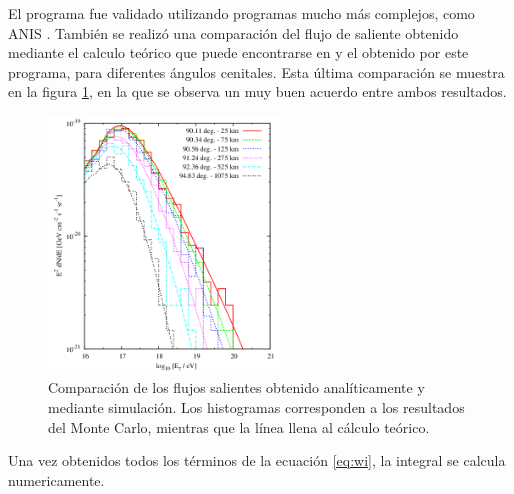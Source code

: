 		El programa fue validado utilizando programas mucho m\'as complejos, como ANIS \cite{anis}.
		Tambi\'en se realiz\'o una comparaci\'on del flujo de \tauon{} saliente obtenido mediante el calculo te\'orico que puede encontrarse en \cite{prop_tau} y el obtenido por este programa, para diferentes \'angulos cenitales.
		Esta \'ultima comparaci\'on se muestra en la figura \ref{fig:comp_tau_mc_teo}, en la que se observa un muy buen acuerdo entre ambos resultados.
		\begin{figure}[ht!]
			\begin{center}
			\includegraphics[width=0.55\textwidth]{fig/simulacionAuger/comp_tau_mc_teo}
			\caption{\label{fig:comp_tau_mc_teo} Comparaci\'on de los flujos salientes obtenido anal\'iticamente y mediante simulaci\'on. Los histogramas corresponden a los resultados del Monte Carlo, mientras que la l\'inea llena al c\'alculo te\'orico.}
			\end{center}
		\end{figure}
		
		
		Una vez obtenidos todos los términos de la ecuación \ref{eq:wi}, la integral se calcula numericamente.